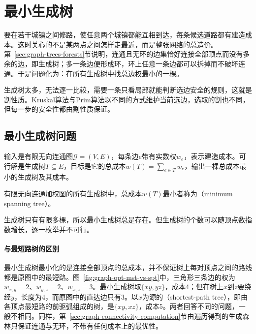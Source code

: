 
\section{最小生成树}
\label{sec:graph-minimum-spanning-tree}

要在若干城镇之间修路，使任意两个城镇都能互相到达，每条候选道路都有建造成本。这时关心的不是某两点之间怎样走最近，而是整张网络的总造价。第~\ref{sec:graph-trees-forests}节说明，连通且无环的边集恰好连接全部顶点而没有多余的边，即生成树；多一条边便形成环，环上任意一条边都可以拆掉而不破坏连通。于是问题化为：在所有生成树中找总边权最小的一棵。

生成树太多，无法逐一比较，需要一条只看局部就能判断选边安全的规则，这就是割性质。Kruskal算法与Prim算法以不同的方式维护当前选边，选取的割也不同，但每一步的安全性都由割性质保证。

\subsection{最小生成树问题}
\label{sec:graph-opt-mst-problem}

输入是有限无向连通图$\mathcal G=(V,E)$，每条边$e$带有实数权$w_e$，表示建造成本。可行解是生成树$T\subseteq E$，目标是它的总成本$w(T)=\sum_{e\in T}w_e$，输出一棵总成本最小的生成树及其成本。

\begin{definition}[最小生成树]
\label{def:graph-opt-mst}
有限无向连通加权图的所有生成树中，总成本$w(T)$最小者称为（minimum spanning tree）。
\end{definition}

生成树只有有限多棵，所以最小生成树总是存在。但生成树的个数可以随顶点数指数增长，逐一枚举并不可行。

\paragraph{与最短路树的区别}
最小生成树最小化的是连接全部顶点的总成本，并不保证树上每对顶点之间的路线都是原图中的最短路。图~\ref{fig:graph-opt-mst-vs-spt}中，三角形三条边的权为$w_{x,y}=2$、$w_{y,z}=2$、$w_{x,z}=3$。最小生成树取$\{xy,yz\}$，成本$4$；但在树上$x$到$z$要绕经$y$，长度为$4$，而原图中的直达边只有$3$。以$x$为源的（shortest-path tree），即由各顶点最短路的前驱弧组成的树，是$\{xy,xz\}$，成本$5$。两者回答不同的问题，一般不相同。同样，第~\ref{sec:graph-connectivity-computation}节由遍历得到的生成森林只保证连通与无环，不带有任何成本上的最优性。

